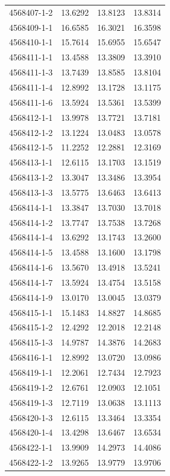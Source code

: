 \begin{longtable}{lrrr}
4568407-1-2 & 13.6292 & 13.8123 & 13.8314 \\
4568409-1-1 & 16.6585 & 16.3021 & 16.3598 \\
4568410-1-1 & 15.7614 & 15.6955 & 15.6547 \\
4568411-1-1 & 13.4588 & 13.3809 & 13.3910 \\
4568411-1-3 & 13.7439 & 13.8585 & 13.8104 \\
4568411-1-4 & 12.8992 & 13.1728 & 13.1175 \\
4568411-1-6 & 13.5924 & 13.5361 & 13.5399 \\
4568412-1-1 & 13.9978 & 13.7721 & 13.7181 \\
4568412-1-2 & 13.1224 & 13.0483 & 13.0578 \\
4568412-1-5 & 11.2252 & 12.2881 & 12.3169 \\
4568413-1-1 & 12.6115 & 13.1703 & 13.1519 \\
4568413-1-2 & 13.3047 & 13.3486 & 13.3954 \\
4568413-1-3 & 13.5775 & 13.6463 & 13.6413 \\
4568414-1-1 & 13.3847 & 13.7030 & 13.7018 \\
4568414-1-2 & 13.7747 & 13.7538 & 13.7268 \\
4568414-1-4 & 13.6292 & 13.1743 & 13.2600 \\
4568414-1-5 & 13.4588 & 13.1600 & 13.1798 \\
4568414-1-6 & 13.5670 & 13.4918 & 13.5241 \\
4568414-1-7 & 13.5924 & 13.4754 & 13.5158 \\
4568414-1-9 & 13.0170 & 13.0045 & 13.0379 \\
4568415-1-1 & 15.1483 & 14.8827 & 14.8685 \\
4568415-1-2 & 12.4292 & 12.2018 & 12.2148 \\
4568415-1-3 & 14.9787 & 14.3876 & 14.2683 \\
4568416-1-1 & 12.8992 & 13.0720 & 13.0986 \\
4568419-1-1 & 12.2061 & 12.7434 & 12.7923 \\
4568419-1-2 & 12.6761 & 12.0903 & 12.1051 \\
4568419-1-3 & 12.7119 & 13.0638 & 13.1113 \\
4568420-1-3 & 12.6115 & 13.3464 & 13.3354 \\
4568420-1-4 & 13.4298 & 13.6467 & 13.6534 \\
4568422-1-1 & 13.9909 & 14.2973 & 14.4086 \\
4568422-1-2 & 13.9265 & 13.9779 & 13.9706 \\

\end{longtable}

